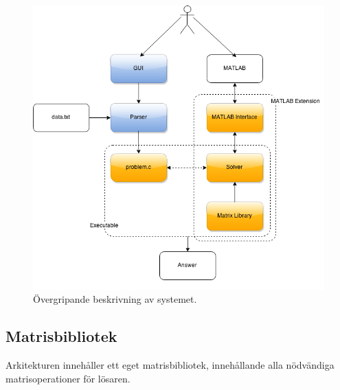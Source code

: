 \begin{figure}[H]
	\begin{center}
		\includegraphics[scale=0.7]{bilder/arkitektur.png}
	\end{center}
	\caption{Övergripande beskrivning av systemet.}
\end{figure}

%



\subsection{Matrisbibliotek}
Arkitekturen innehåller ett eget matrisbibliotek, innehållande alla nödvändiga matrisoperationer för lösaren.

